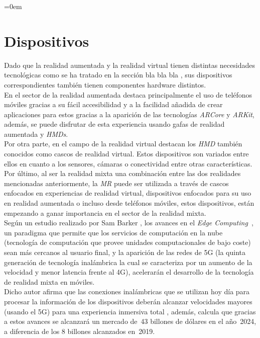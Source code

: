 \parindent=0em
\section{Dispositivos}
\noindent

Dado que la realidad aumentada y la realidad virtual tienen distintas necesidades tecnológicas como se ha tratado en la sección bla bla bla , sus dispositivos correspondientes también tienen componentes hardware distintos.\\

En el sector de la realidad aumentada destaca principalmente el uso de teléfonos móviles gracias a su fácil accesibilidad y a la facilidad añadida de crear aplicaciones para estos gracias a la aparición de las tecnologías \textit{ARCore} y \textit{ARKit}, además, se puede disfrutar de esta experiencia usando gafas de realidad aumentada y \textit{HMDs}.\\

Por otra parte, en el campo de la realidad virtual destacan los \textit{HMD} también conocidos como cascos de realidad virtual. Estos dispositivos son variados entre ellos en cuanto a los sensores, cámaras o conectividad entre otras características.\\

Por último, al ser la realidad mixta una combinación entre las dos realidades mencionadas anteriormente, la \textit{MR} puede ser utilizada a través de cascos enfocados en experiencias de realidad virtual, dispositivos enfocados para su uso en realidad aumentada o incluso desde teléfonos móviles, estos dispositivos, están empezando a ganar importancia en el sector de la realidad mixta.\\

Según un estudio realizado por Sam Barker \cite{juniperArMrmoney}, los avances en el \textit{Edge Computing}~\cite{edgeComputing}, un paradigma que permite que los servicios de computación en la nube~\cite{cloudComputing} (tecnología de computación que provee unidades computacionales de bajo coste) sean más cercanos al usuario final, y la aparición de las redes de 5G (la quinta generación de tecnología inalámbrica la cual se caracteriza por un aumento de la velocidad y menor latencia frente al 4G), acelerarán el desarrollo de la tecnología de realidad mixta en móviles.\\

Dicho autor afirma que las conexiones inalámbricas que se utilizan hoy día para procesar la información de los dispositivos deberán alcanzar velocidades mayores (usando el 5G) para una experiencia inmersiva total , además, calcula que gracias a estos avances se alcanzará un mercado de~43 billones de dólares en el año~2024, a diferencia de los 8 billones alcanzados en~2019.

